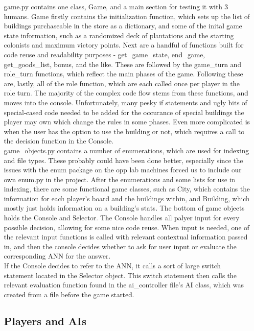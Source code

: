 game.py contains one class, Game, and a main section for testing it with 3 humans.  Game firstly contains the initialization function, which sets up the list of buildings purchaseable in the store as a dictionary, and some of the inital game state information, such as a randomized deck of plantations and the starting colonists and maximum victory points.  Next are a handful of functions built for code reuse and readability purposes -  get{\_}game{\_}state, end{\_}game, get{\_}goods{\_}list, bonus, and the like.  These are followed by the game{\_}turn and role{\_}turn functions, which reflect the main phases of the game.  Following these are, lastly, all of the role function, which are each called once per player in the role turn.  The majority of the complex code flow stems from these functions, and moves into the console.  Unfortunately, many pesky if statements and ugly bits of special-cased code needed to be added for the occurance of special buildings the player may own which change the rules in some phases.  Even more complicated is when the user has the option to use the building or not, which requires a call to the decision function in the Console.
\\
game{\_}objects.py contains a number of enumerations, which are used for indexing and file types.  These probably could have been done better, especially since the issues with the enum package on the opp lab machines forced us to include our own enum.py in the project.  After the enumerations and some lists for use in indexing, there are some functional game classes, such as City, which contains the information for each player's board and the buildings within, and Building, which mostly just holds information on a building's stats.  The bottom of game objects holds the Console and Selector.  The Console handles all palyer input for every possible decision, allowing for some nice code reuse.  When input is needed, one of the relevant input functions is called with relevant contextual information passed in, and then the console decides whether to ask for user input or evaluate the corresponding ANN for the answer.
\\
If the Console decides to refer to the ANN, it calls a sort of large switch statement located in the Selector object.  This switch statement then calls the relevant evaluation function found in the ai{\_}controller file's AI class, which was created from a file before the game started.

\subsection{Players and AIs}

